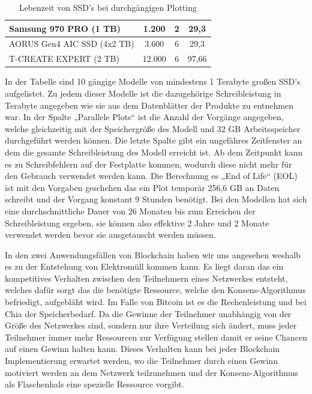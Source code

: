 \begin{table}
\begin{tabular}{l|c|c|c}
		\hline
		Samsung 970 PRO (1 TB)          & 1.200                                                                   & 2                                                         & 29,3                                                                \\ 
		\hline
		AORUS Gen4 AIC SSD (4x2 TB)   & 3.600                                                                   & 6                                                         & 29,3                                                                \\ 
		\hline
		T-CREATE EXPERT (2 TB) & 12.000                                                                  & 6                                                         & 97,66                                                               \\
		\hline
	\end{tabular}
	\caption{Lebenzeit von SSD's bei durchgängigen Plotting}
\end{table}
In der Tabelle sind 10 gängige Modelle von mindestens 1 Terabyte großen SSD’s aufgelistet. Zu jedem dieser Modelle ist die dazugehörige Schreibleistung in Terabyte angegeben wie sie aus dem Datenblätter der Produkte zu entnehmen war. In der Spalte „Parallele Plots“ ist die Anzahl der Vorgänge angegeben, welche gleichzeitig mit der Speichergröße des Modell und 32 GB Arbeitsspeicher durchgeführt werden können. Die letzte Spalte gibt ein ungefähres Zeitfenster an dem die gesamte Schreibleistung des Modell erreicht ist. Ab dem Zeitpunkt kann es zu Schreibfehlern auf der Festplatte kommen, wodurch diese nicht mehr für den Gebrauch verwendet werden kann. Die Berechnung es „End of Life“ (EOL) ist mit den Vorgaben geschehen das ein Plot temporär 256,6 GB an Daten schreibt und der Vorgang konstant 9 Stunden benötigt. Bei den Modellen hat sich eine durchschnittliche Dauer von 26 Monaten bis zum Erreichen der Schreibleistung ergeben, sie können also effektive 2 Jahre und 2 Monate verwendet werden bevor sie ausgetauscht werden müssen.

In den zwei Anwendungsfällen von Blockchain haben wir uns angesehen weshalb es zu der Entstehung von Elektromüll kommen kann. Es liegt daran das ein kompetitives Verhalten zwischen den Teilnehmern eines Netzwerkes entsteht, welches dafür sorgt das die benötigte Ressource, welche den Konsens-Algorithmus befriedigt, aufgebläht wird. Im Falle von Bitcoin ist es die Rechenleistung und bei Chia der Speicherbedarf. Da die Gewinne der Teilnehmer unabhängig von der Größe des Netzwerkes sind, sondern nur ihre Verteilung sich ändert, muss jeder Teilnehmer immer mehr Ressourcen zur Verfügung stellen damit er seine Chancen auf einen Gewinn halten kann. Dieses Verhalten kann bei jeder Blockchain Implementierung erwartet werden, wo die Teilnehmer durch einen Gewinn motiviert werden an dem Netzwerk teilzunehmen und der Konsens-Algorithmus als Flaschenhals eine spezielle Ressource vorgibt.
\clearpage

